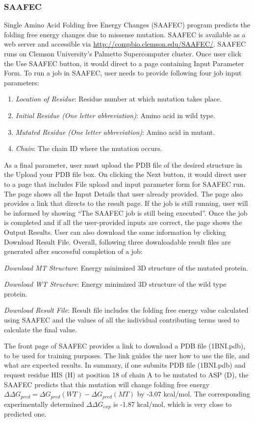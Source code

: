 \documentclass[9pt,tutorial]{livecoms}
\begin{document}
\subsubsection{SAAFEC} Single Amino Acid Folding free Energy Changes (SAAFEC) program\cite{getov2016saafec} predicts the folding free energy changes due to missense mutation. SAAFEC is available as a web server and accessible via \url{http://compbio.clemson.edu/SAAFEC/}. SAAFEC runs on Clemson University’s Palmetto Supercomputer cluster. Once user click the Use SAAFEC button, it would direct to a page containing Input Parameter Form. To run a job in SAAFEC, user needs to provide following four job input parameters:
\begin{enumerate}
\item \textit{Location of Residue}: Residue number at which mutation takes place.
\item \textit{Initial Residue (One letter abbreviation)}: Amino acid in wild type.
\item \textit{Mutated Residue (One letter abbreviation)}: Amino acid in mutant. 
\item \textit{Chain}: The chain ID where the mutation occurs.
\end{enumerate}
As a final parameter, user must upload the PDB file of the desired structure in the Upload your PDB file box. On clicking the Next button, it would direct user to a page that includes File upload and input parameter form for SAAFEC run. The page shows all the Input Details that user already provided. The page also provides a link that directs to the result page. If the job is still running, user will be informed by showing ``The SAAFEC job is still being executed''. Once the job is completed and if all the user-provided inputs are correct, the page shows the Output Results. User can also download the same information by clicking Download Result File. Overall, following three downloadable result files are generated after successful completion of a job:

\textit{Download MT Structure}: Energy minimized 3D structure of the mutated protein.
	
\textit{Download WT Structure}: Energy minimized 3D structure of the wild type protein.

\textit{Download Result File}: Result file includes the folding free energy value calculated using SAAFEC and the values of all the individual contributing terms used to calculate the final value. 


The front page of SAAFEC provides a link to download a PDB file (1BNI.pdb), to be used for training purposes. The link guides the user how to use the file, and what are expected results. In summary, if one submits PDB file (1BNI.pdb) and request residue  HIS (H) at position 18 of chain A to be mutated to ASP (D), the SAAFEC predicts that this mutation will change folding free energy $ \Delta\Delta G_{pred} = \Delta G_{pred}(WT) - \Delta G_{pred}(MT) $ by -3.07 kcal/mol. The corresponding experimentally determined $ \Delta\Delta G_{exp} $ is  -1.87 kcal/mol, which is very close to predicted one.
\end{document}
